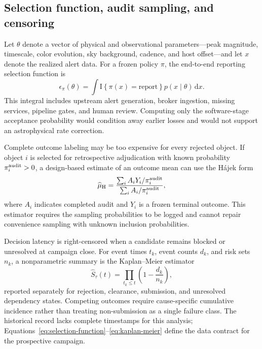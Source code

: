 \documentclass[11pt]{article}
\begin{document}
\subsection{Selection function, audit sampling, and censoring}

Let $\theta$ denote a vector of physical and observational parameters---peak magnitude, timescale, color evolution, sky background, cadence, and host offset---and let $x$ denote the realized alert data. For a frozen policy $\pi$, the end-to-end reporting selection function is
\begin{equation}
  \epsilon_{\pi}(\theta)=
  \int \mathrm{I}\!\left\{\pi(x)=\text{report}\right\}
  p(x\mid\theta)\,\mathrm{d}x.
\label{eq:selection-function}
\end{equation}
This integral includes upstream alert generation, broker ingestion, missing services, pipeline gates, and human review. Computing only the software-stage acceptance probability would condition away earlier losses and would not support an astrophysical rate correction.

Complete outcome labeling may be too expensive for every rejected object. If object $i$ is selected for retrospective adjudication with known probability $\pi_i^{\rm audit}>0$, a design-based estimate of an outcome mean can use the H\'ajek form
\begin{equation}
  \widehat{\mu}_{\rm H}=
  \frac{\sum_i A_iY_i/\pi_i^{\rm audit}}
       {\sum_i A_i/\pi_i^{\rm audit}},
\label{eq:hajek}
\end{equation}
where $A_i$ indicates completed audit and $Y_i$ is a frozen terminal outcome. This estimator requires the sampling probabilities to be logged and cannot repair convenience sampling with unknown inclusion probabilities.

Decision latency is right-censored when a candidate remains blocked or unresolved at campaign close. For event times $t_k$, event counts $d_k$, and risk sets $n_k$, a nonparametric summary is the Kaplan--Meier estimator
\begin{equation}
  \widehat{S}_{\tau}(t)=\prod_{t_k\leq t}\left(1-\frac{d_k}{n_k}\right),
\label{eq:kaplan-meier}
\end{equation}
reported separately for rejection, clearance, submission, and unresolved dependency states. Competing outcomes require cause-specific cumulative incidence rather than treating non-submission as a single failure class. The historical record lacks complete timestamps for this analysis; Equations~\ref{eq:selection-function}--\ref{eq:kaplan-meier} define the data contract for the prospective campaign.
\end{document}
